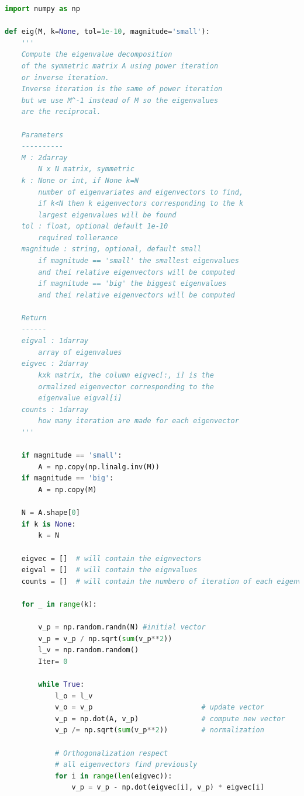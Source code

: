\documentclass[10pt,a4paper]{article}
\begin{document}
\begin{lstlisting}[language=Python]
import numpy as np

def eig(M, k=None, tol=1e-10, magnitude='small'):
    '''
    Compute the eigenvalue decomposition
    of the symmetric matrix A using power iteration
    or inverse iteration.
    Inverse iteration is the same of power iteration
    but we use M^-1 instead of M so the eigenvalues
    are the reciprocal.

    Parameters
    ----------
    M : 2darray
        N x N matrix, symmetric
    k : None or int, if None k=N
        number of eigenvariates and eigenvectors to find,
        if k<N then k eigenvectors corresponding to the k
        largest eigenvalues will be found
    tol : float, optional default 1e-10
        required tollerance
    magnitude : string, optional, default small
        if magnitude == 'small' the smallest eigenvalues
        and thei relative eigenvectors will be computed
        if magnitude == 'big' the biggest eigenvalues
        and thei relative eigenvectors will be computed

    Return
    ------
    eigval : 1darray
        array of eigenvalues
    eigvec : 2darray
        kxk matrix, the column eigvec[:, i] is the
        ormalized eigenvector corresponding to the
        eigenvalue eigval[i]
    counts : 1darray
        how many iteration are made for each eigenvector
    '''

    if magnitude == 'small':
        A = np.copy(np.linalg.inv(M))
    if magnitude == 'big':
        A = np.copy(M)
        
    N = A.shape[0]
    if k is None:
        k = N

    eigvec = []  # will contain the eignvectors
    eigval = []  # will contain the eignvalues
    counts = []  # will contain the numbero of iteration of each eigenvalue

    for _ in range(k):

        v_p = np.random.randn(N) #initial vector
        v_p = v_p / np.sqrt(sum(v_p**2))
        l_v = np.random.random()
        Iter= 0

        while True:
            l_o = l_v
            v_o = v_p                          # update vector
            v_p = np.dot(A, v_p)               # compute new vector
            v_p /= np.sqrt(sum(v_p**2))        # normalization

            # Orthogonalization respect
            # all eigenvectors find previously
            for i in range(len(eigvec)):
                v_p = v_p - np.dot(eigvec[i], v_p) * eigvec[i]
                

\end{lstlisting}
\end{document}
